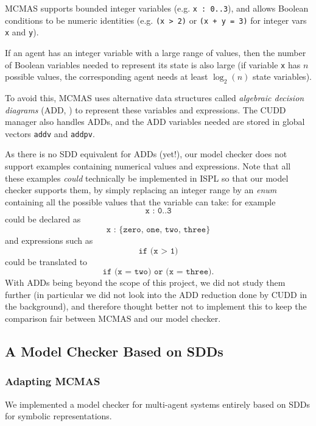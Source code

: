\documentclass[11pt]{article}
\begin{document}
MCMAS supports bounded integer variables (e.g. \texttt{x : 0..3}), and allows Boolean conditions to be numeric identities (e.g. \texttt{(x > 2)} or \texttt{(x + y = 3)} for integer vars \texttt{x} and \texttt{y}). 

If an agent has an integer variable with a large range of values, then the number of Boolean variables needed to represent its state is also large (if variable \texttt{x} has $n$ possible values, the corresponding agent needs at least $\log_2(n)$ state variables). 

To avoid this, MCMAS uses alternative data structures called \textit{algebraic decision diagrams} (ADD, \cite{add}) to represent these variables and expressions. The CUDD manager also handles ADDs, and the ADD variables needed are stored in global vectors \texttt{addv} and \texttt{addpv}.

As there is no SDD equivalent for ADDs (yet!), our model checker does not support examples containing numerical values and expressions.
Note that all these examples \textit{could} technically be implemented in ISPL so that our model checker supports them, by simply replacing an integer range by an \textit{enum} containing all the possible values that the variable can take: for example 
$$\texttt{x : 0..3} $$
could be declared as $$\texttt{x : \{zero, one, two, three\}}$$
and expressions such as $$\texttt{if (x > 1)}$$ could be translated to $$\texttt{if (x = two) or (x = three)}.$$
With ADDs being beyond the scope of this project, we did not study them further (in particular we did not look into the ADD reduction done by CUDD in the background), and therefore thought better not to implement this to keep the comparison fair between MCMAS and our model checker. 

\subsection{A Model Checker Based on SDDs}

\subsubsection{Adapting MCMAS}

We implemented a model checker for multi-agent systems entirely based on SDDs for symbolic representations. 
\end{document}
